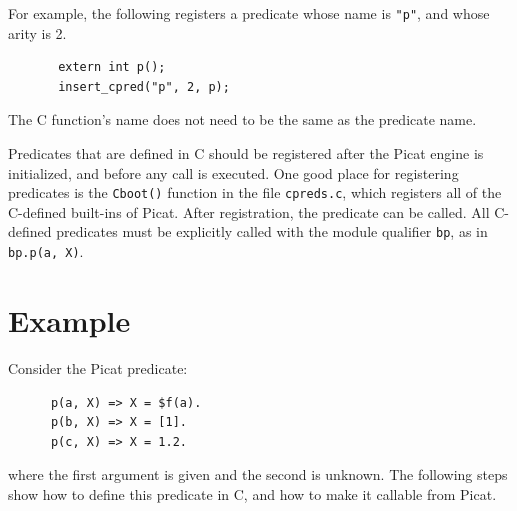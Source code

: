 For example, the following registers a predicate whose name is \texttt{"p"}, and whose arity is 2.
\begin{verbatim}
       extern int p();	
       insert_cpred("p", 2, p);
\end{verbatim}
The C function's name does not need to be the same as the predicate name.

Predicates that are defined in C should be registered after the Picat engine is initialized, and before any call is executed. One good place for registering predicates is the \texttt{Cboot()} function in the file \texttt{cpreds.c}, which registers all of the C-defined built-ins of Picat. After registration, the predicate can be called. All C-defined predicates must be explicitly called with the module qualifier \texttt{bp}, as in \texttt{bp.p(a, X)}.

\section*{Example}
Consider the Picat predicate:
\begin{verbatim}
      p(a, X) => X = $f(a).
      p(b, X) => X = [1].
      p(c, X) => X = 1.2.
\end{verbatim}
where the first argument is given and the second is unknown. The following steps show how to define this predicate in C, and how to make it callable from Picat.


